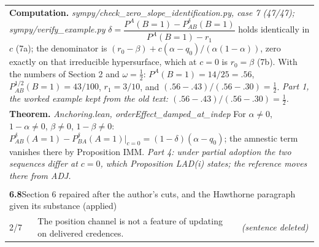 \documentclass[10pt]{article}
\theoremstyle{definition}
\newlength{\fullw}\setlength{\fullw}{25.9cm}
\newcommand{\entryhead}[2]{\multicolumn{3}{|l|}{\rule{0pt}{2.6ex}\large\textbf{#1}\quad #2} \\ \hline}
\begin{document}
{\begin{longtable}{|p{0.9cm}|p{12.2cm}|p{12.2cm}|}
\multicolumn{3}{|p{\fullw}|}{\textbf{Computation.} \textit{sympy/check\_zero\_slope\_identification.py, case 7 (47/47); sympy/verify\_example.py} \newline $\delta=\dfrac{P^{A}(B{=}1)-P^{\delta}_{AB}(B{=}1)}{P^{A}(B{=}1)-r_1}$ holds
identically in $c$ (7a); the denominator is $(r_0-\beta)+c(\alpha-q_0)/(\alpha(1-\alpha))$,
zero exactly on that irreducible hypersurface, which at $c=0$ is $r_0=\beta$ (7b). With the numbers of Section 2 and $\omega=\tfrac12$:
$P^{A}(B{=}1)=14/25=.56$, $P^{1/2}_{AB}(B{=}1)=43/100$, $r_1=3/10$, and
$(.56-.43)/(.56-.30)=\tfrac12$. \newline \textit{Part 1, the worked example kept from the old text: $(.56-.43)/(.56-.30)=\tfrac12$.}} \\
\multicolumn{3}{|p{\fullw}|}{\textbf{Theorem.} \textit{Anchoring.lean, orderEffect\_damped\_at\_indep} \newline For $\alpha\neq0$, $1-\alpha\neq0$, $\beta\neq0$, $1-\beta\neq0$:
$P^{\delta}_{AB}(A{=}1)-P^{\delta}_{BA}(A{=}1)\big|_{c=0}=(1-\delta)(\alpha-q_0)$; the
amnestic term vanishes there by Proposition IMM. \newline \textit{Part 4: under partial adoption the two sequences differ at $c=0$, which Proposition LAD(i) states; the reference moves there from ADJ.}} \\ \hline
\multicolumn{3}{|l|}{} \\ \hline
\entryhead{6.8}{Section 6 repaired after the author's cuts, and the Hawthorne paragraph given its substance (applied)\quad{\footnotesize\textit{(formerly C.26)}}}
2/7 & The position channel is not a feature of updating on delivered credences. & \textit{(sentence deleted)} \\ \hline

\end{longtable}}
\end{document}
